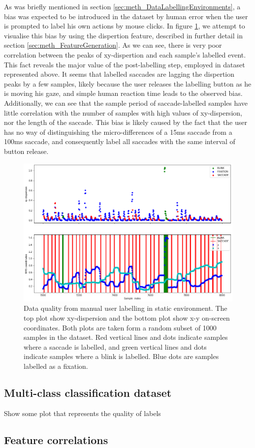 As was briefly mentioned in section \ref{sec:meth_DataLabellingEnvironments}, a bias was expected to be introduced in the dataset by human error when the user is prompted to label his own actions by mouse clicks. In figure \ref{fig:res_HumanErrorBias}, we attempt to visualise this bias by using the dispertion feature, described in further detail in section \ref{sec:meth_FeatureGeneration}. As we can see, there is very poor correlation between the peaks of xy-dispertion and each sample's labelled event. This fact reveals the major value of the post-labelling step, employed in dataset represented above. It seems that labelled saccades are lagging the dispertion peaks by a few samples, likely because the user releases the labelling button as he is moving his gaze, and simple human reaction time leads to the observed bias. Additionally, we can see that the sample period of saccade-labelled samples have little correlation with the number of samples with high values of xy-dispersion, nor the length of the saccade. This bias is likely caused by the fact that the user has no way of distinguishing the micro-differences of a 15ms saccade from a 100ms saccade, and consequently label all saccades with the same interval of button release. 

\begin{figure}[h]
    \centering
    \includegraphics[width=\textwidth]{Images/Dataset/DQ_V1.png}
    \caption{Data quality from manual user labelling in static environment. The top plot show xy-dispersion and the bottom plot show x-y on-screen coordinates. Both plots are taken form a random subset of 1000 samples in the dataset. Red vertical lines and dots indicate samples where a saccade is labelled, and green vertical lines and dots indicate samples where a blink is labelled. Blue dots are samples labelled as a fixation.}
    \label{fig:res_HumanErrorBias}
\end{figure}

\subsection{Multi-class classification dataset}

Show some plot that represents the quality of labels

\subsection{Feature correlations}